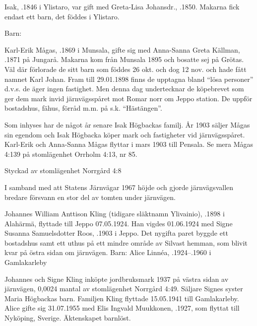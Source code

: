 Isak, .1846 i Ylistaro, var gift med Greta-Lisa Johansdr., .1850. Makarna fick endast ett barn, det föddes i Ylistaro.

Barn: 


Karl-Erik Mågas, .1869 i Munsala, gifte sig med Anna-Sanna Greta Källman, .1871 på Jungarå. Makarna kom från Munsala 1895 och bosatte sej på Grötas. Väl där förlorade de sitt barn som föddes 26 okt. och dog 12 nov. och hade fått namnet Karl Johan. Fram till 29.01.1898 finns de upptagna bland ``lösa personer'' d.v.s. de äger ingen fastighet. Men denna dag undertecknar de köpebrevet som ger dem mark invid järnvägsspåret mot Romar norr om Jeppo station. De uppför bostadshus, fähus, förråd m.m. på s.k. ``Hästängen''.

Som inhyses har de något år senare Isak Högbackas familj. År 1903 säljer Mågas sin egendom och Isak Högbacka köper mark och fastigheter vid järnvägsspåret. Karl-Erik och Anna-Sanna Mågas flyttar i mars 1903 till Pensala. Se mera Mågas 4:139	på stomlägenhet Orrholm 4:13, nr 85.




Styckad av stomlägenhet Norrgård 4:8


I samband med att Statens Järnvägar 1967  höjde och gjorde 	järnvägsvallen bredare försvann en stor del av tomten under järnvägen.\jhvspace{}



Johannes William Anttison Kling (tidigare släktnamn Ylivainio), .1898 i Alahärmä, flyttade till Jeppo 07.05.1924. Han vigdes 01.06.1924 med Signe Susanna Samuelsdotter Roos, .1903 i Jeppo. Det nygifta paret byggde ett bostadshus samt ett uthus 	på ett mindre område av Silvast hemman, som blivit kvar på östra sidan om järnvägen.
Barn: Alice Linnéa, .1924--.1960 i Gamlakarleby

Johannes och Signe Kling inköpte jordbruksmark 1937 på västra sidan av	järnvägen, 0,0024 mantal av stomlägenhet Norrgård 4:49. Säljare Signes syster Maria Högbackas barn.	Familjen Kling flyttade 15.05.1941 till Gamlakarleby. Alice gifte sig 31.07.1955 med Elis Ingvald Muukkonen, .1927, som flyttat till Nyköping, Sverige. Äktenskapet barnlöst.

